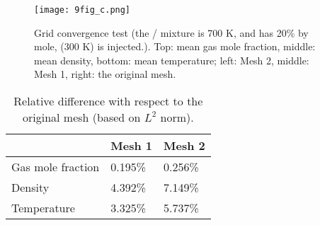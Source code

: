 {    \begin{figure}[htbp]
        \centering


        \texttt{[image: 9fig\_c.png]}
        \caption{Grid convergence test (the / mixture is 700 K, and has 20\%  by mole,  (300 K) is injected.). Top: mean gas mole fraction, middle: mean density, bottom: mean temperature; left: Mesh 2, middle: Mesh 1, right: the original mesh.}
        \label{converge}
    \end{figure}

    \begin{table}[htbp]
        \centering
        \begin{minipage}{0.9\textwidth}
            \caption{Relative difference with respect to the original mesh (based on $L^2$ norm).} \label{converge:error}
            \begin{center}
                \begin{tabular}{@{}l|ll@{}} %
                    \toprule
                                      & Mesh 1   & Mesh 2   \\ %
                    \midrule
                    Gas mole fraction & 0.195\% & 0.256\% \\%
                    Density           & 4.392\% & 7.149\% \\ %
                    Temperature       & 3.325\% & 5.737\% \\
                    \bottomrule
                \end{tabular}


\end{center}
\end{minipage}
\end{table}}
